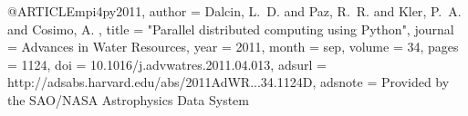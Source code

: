 
@ARTICLE{mpi4py2011,
   author = {{Dalcin}, L.~D. and {Paz}, R.~R. and {Kler}, P.~A. and {Cosimo}, A.
	},
    title = "{Parallel distributed computing using Python}",
  journal = {Advances in Water Resources},
     year = 2011,
    month = sep,
   volume = 34,
    pages = {1124},
      doi = {10.1016/j.advwatres.2011.04.013},
   adsurl = {http://adsabs.harvard.edu/abs/2011AdWR...34.1124D},
  adsnote = {Provided by the SAO/NASA Astrophysics Data System}
}
